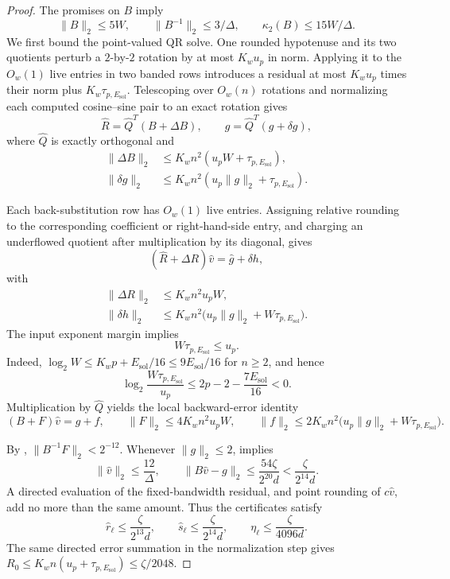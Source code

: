 \documentclass[11pt]{article}
\begin{document}
\begin{proof}
The promises on $B$ imply
\[
 \lVert B\rVert_2\leq5W,
 \qquad
 \lVert B^{-1}\rVert_2\leq3/\Delta,
 \qquad
 \kappa_2(B)\leq15W/\Delta.
\]
We first bound the point-valued QR solve.  One rounded hypotenuse and its two
quotients perturb a $2$-by-$2$ rotation by at most $K_wu_p$ in norm.
Applying it to the $O_w(1)$ live entries in two banded rows introduces a
residual at most $K_wu_p$ times their norm plus
$K_w\tau_{p,E_{\mathrm{sol}}}$.  Telescoping over $O_w(n)$ rotations and
normalizing each computed cosine--sine pair to an exact rotation gives
\[
 \widehat R=\widehat Q^T(B+\Delta B),
 \qquad
 \widehat g=\widehat Q^T(g+\delta g),
\]
where $\widehat Q$ is exactly orthogonal and
\begin{align*}
 \lVert\Delta B\rVert_2
  &\leq K_wn^2(u_pW+\tau_{p,E_{\mathrm{sol}}}),\\
 \lVert\delta g\rVert_2
  &\leq K_wn^2(u_p\lVert g\rVert_2+
        \tau_{p,E_{\mathrm{sol}}}).
\end{align*}

Each back-substitution row has $O_w(1)$ live entries.  Assigning relative
rounding to the corresponding coefficient or right-hand-side entry, and
charging an underflowed quotient after multiplication by its diagonal,
gives
\[
 (\widehat R+\Delta R)\widehat v=\widehat g+\delta h,
\]
with
\begin{align*}
 \lVert\Delta R\rVert_2&\leq K_wn^2u_pW,\\
 \lVert\delta h\rVert_2&\leq
 K_wn^2\bigl(u_p\lVert g\rVert_2+
 W\tau_{p,E_{\mathrm{sol}}}\bigr).
\end{align*}
The input exponent margin implies
\[
 W\tau_{p,E_{\mathrm{sol}}}\leq u_p.
\]
Indeed, $\log_2W\leq K_wp+E_{\mathrm{sol}}/16
\leq9E_{\mathrm{sol}}/16$ for $n\geq2$, and hence
\[
 \log_2\frac{W\tau_{p,E_{\mathrm{sol}}}}{u_p}
 \leq2p-2-\frac{7E_{\mathrm{sol}}}{16}<0.
\]
Multiplication by $\widehat Q$ yields the local backward-error identity
\begin{equation}
 \label{eq:qr-local-backward}
 (B+F)\widehat v=g+f,
 \qquad
 \lVert F\rVert_2\leq4K_wn^2u_pW,
 \qquad
 \lVert f\rVert_2\leq
 2K_wn^2\bigl(u_p\lVert g\rVert_2+
 W\tau_{p,E_{\mathrm{sol}}}\bigr).
\end{equation}

By ,
$\lVert B^{-1}F\rVert_2<2^{-12}$.  Whenever $\lVert g\rVert_2\leq2$,
 implies
\[
 \lVert\widehat v\rVert_2\leq\frac{12}{\Delta},
 \qquad
 \lVert B\widehat v-g\rVert_2
 \leq\frac{54\zeta}{2^{20}d}
 <\frac{\zeta}{2^{14}d}.
\]
A directed evaluation of the fixed-bandwidth residual, and point rounding of
$c\widehat v$, add no more than the same amount.  Thus the certificates
satisfy
\begin{equation}
 \label{eq:local-solve-bounds}
 \widehat r_\ell\leq\frac{\zeta}{2^{13}d},
 \qquad
 \widehat s_\ell\leq\frac{\zeta}{2^{14}d},
 \qquad
 \eta_\ell\leq\frac{\zeta}{4096d}.
\end{equation}
The same directed error summation in the normalization step gives
$R_0\leq K_wn(u_p+\tau_{p,E_{\mathrm{sol}}})\leq\zeta/2048$.


\end{proof}
\end{document}
